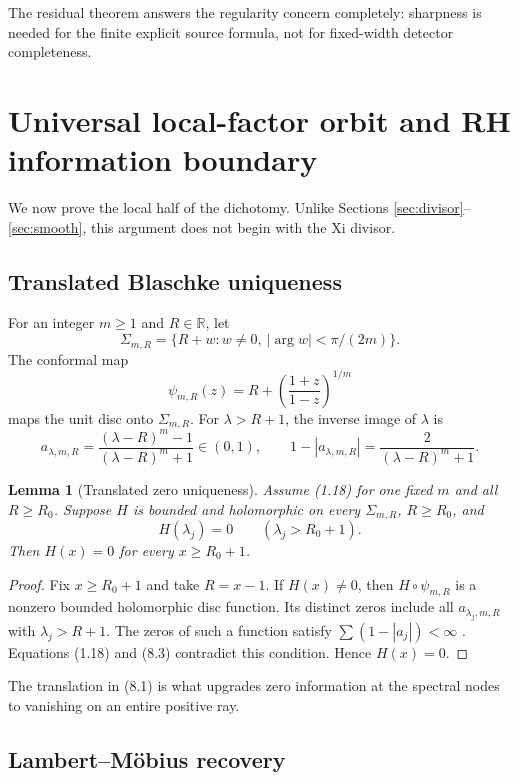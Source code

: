 \documentclass[11pt]{article}
\newtheorem{lemma}[theorem]{Lemma}
\newcommand{\R}{\mathbb R}
\begin{document}
The residual theorem answers the regularity concern completely: sharpness is needed for the
finite explicit source formula, not for fixed-width detector completeness.

\section{Universal local-factor orbit and RH information boundary}\label{sec:local}

We now prove the local half of the dichotomy.  Unlike Sections
\ref{sec:divisor}--\ref{sec:smooth}, this argument does not begin with the Xi divisor.

\subsection{Translated Blaschke uniqueness}

For an integer \(m\ge1\) and \(R\in\R\), let
\[
 \Sigma_{m,R}=
 \{R+w:w\ne0,\ |\arg w|<\pi/(2m)\}.
\tag{8.1}
\]
The conformal map
\[
 \psi_{m,R}(z)=
 R+\left(\frac{1+z}{1-z}\right)^{1/m}
\tag{8.2}
\]
maps the unit disc onto \(\Sigma_{m,R}\).  For \(\lambda>R+1\), the inverse image of
\(\lambda\) is
\[
 a_{\lambda,m,R}
 =\frac{(\lambda-R)^m-1}{(\lambda-R)^m+1}\in(0,1),
 \qquad
 1-|a_{\lambda,m,R}|
 =\frac2{(\lambda-R)^m+1}.
\tag{8.3}
\]

\begin{lemma}[Translated zero uniqueness]\label{lem:local-blaschke}
Assume (1.18) for one fixed \(m\) and all \(R\ge R_0\).  Suppose \(H\) is bounded and
holomorphic on every \(\Sigma_{m,R}\), \(R\ge R_0\), and
\[
 H(\lambda_j)=0\qquad(\lambda_j>R_0+1).
\tag{8.4}
\]
Then \(H(x)=0\) for every \(x\ge R_0+1\).
\end{lemma}

\begin{proof}
Fix \(x\ge R_0+1\) and take \(R=x-1\).  If \(H(x)\ne0\), then
\(H\circ\psi_{m,R}\) is a nonzero bounded holomorphic disc function.  Its distinct zeros include
all \(a_{\lambda_j,m,R}\) with \(\lambda_j>R+1\).  The zeros of such a function satisfy
\(\sum(1-|a_j|)<\infty\) \cite[Chapter II]{Garnett2007}.  Equations (1.18) and (8.3)
contradict this condition.  Hence \(H(x)=0\).
\end{proof}

The translation in (8.1) is what upgrades zero information at the spectral nodes to
vanishing on an entire positive ray.

\subsection{Lambert--M\"obius recovery}
\end{document}
